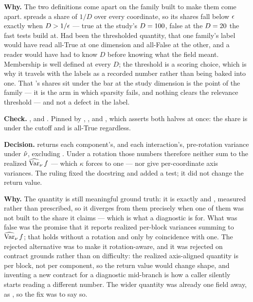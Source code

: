 \textbf{Why.} The two definitions come apart on the family built to make them
come apart.  spreads a share of $1/D$ over every
coordinate, so its shares fall below $\epsilon$ exactly when $D>1/\epsilon$
--- true at the study's $D=100$, false at the $D=20$ the
fast tests build at. Had  been the thresholded quantity, that
one family's label would have read all-True at one dimension and all-False at
the other, and a reader would have had to know $D$ before knowing what the
field meant. Membership is well defined at every $D$; the threshold is a
scoring choice, which is why it travels with the labels as a recorded number
rather than being baked into one. That 's shares sit under
the bar at the study dimension is the point of the family --- it is the arm in
which sparsity fails, and nothing clears the relevance threshold --- and not a
defect in the label.

\begin{sloppypar}
\textbf{Check.} ,  and
. Pinned by
,
,
and
,
which asserts both halves at once: the share is under the cutoff and
 is all-True regardless.
\end{sloppypar}

\label{app:so:a4:r31}

\textbf{Decision.}  returns
each component's, and each interaction's, pre-rotation variance under $\hat\nu$,
excluding . Under a rotation those numbers therefore neither sum
to the realized $\operatorname{\widehat{\mathrm{Var}}}_\nu f$
--- which $\kappa$ forces to one --- nor give per-coordinate axis variances.
The ruling fixed the docstring and added a test; it did not change the return
value.

\textbf{Why.} The quantity is still meaningful ground truth: it is exactly
 and , measured rather than
prescribed, so it diverges from them precisely when one of them was not built
to the share it claims --- which is what a diagnostic is for. What was false was
the promise that it reports realized per-block variances summing to $\operatorname{\widehat{\mathrm{Var}}}_\nu f$;
that holds without a rotation and only by coincidence with one. The rejected
alternative was to make it rotation-aware, and it was rejected on contract
grounds rather than on difficulty: the realized axis-aligned quantity is per
block, not per component, so the return value would change shape, and inventing
a new contract for a diagnostic mid-branch is how a caller silently starts
reading a different number. The wider quantity was already one field away, as
, so the fix was to say so.

